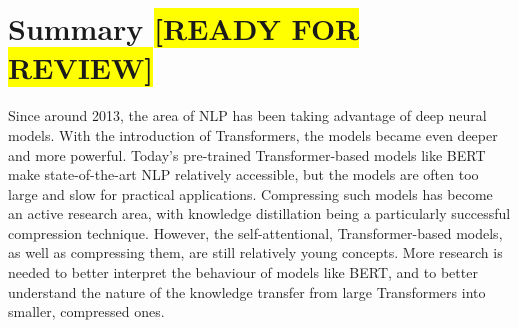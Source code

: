 \documentclass[bsc,frontabs,twoside,singlespacing,parskip,deptreport]{infthesis}
\def\reviewready{\colorbox{yellow}{[READY FOR REVIEW]}}
\begin{document}
{{    %
  }

  \section{Summary \reviewready}{
    Since around 2013, the area of NLP has been taking advantage of deep neural models.
    With the introduction of Transformers, the models became even deeper and more powerful.
    Today's pre-trained Transformer-based models like BERT make state-of-the-art NLP relatively accessible, but the models are often too large and slow for practical applications.
    Compressing such models has become an active research area, with knowledge distillation being a particularly successful compression technique.
    However, the self-attentional, Transformer-based models, as well as compressing them, are still relatively young concepts.
    More research is needed to better interpret the behaviour of models like BERT, and to better understand the nature of the knowledge transfer from large Transformers into smaller, compressed ones.
  }
}
\end{document}
